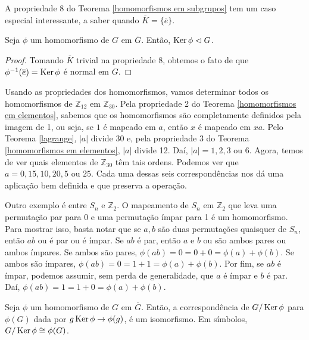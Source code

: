 	\par\vspace{0.3cm} A propriedade 8 do Teorema \eqref{homomorfismos em subgrupos} tem um caso especial interessante, a saber quando $\overline{K} = \{\overline{e}\}$.
	
	\begin{corollary}
		\label{nucleo normal}
		Seja $\phi$ um homomorfismo de $G$ em $\overline{G}$. Então, $\operatorname{Ker}\phi\vartriangleleft G$. 
	\end{corollary}
	
	\begin{proof}
		Tomando $\overline{K}$ trivial na propriedade 8, obtemos o fato de que $\phi^{-1}(\overline{e}) = \operatorname{Ker}\phi$ é normal em $G$.
	\end{proof}
	\par\vspace{0.3cm} Usando as propriedades dos homomorfismos, vamos determinar todos os homomorfismos de $\mathbb{Z}_{12}$ em $\mathbb{Z}_{30}$. Pela propriedade 2 do Teorema \eqref{homomorfismos em elementos}, sabemos que os homomorfismos são completamente definidos pela imagem de 1, ou seja, se $1$ é mapeado em $a$, então $x$ é mapeado em $xa$. Pelo Teorema \eqref{lagrange}, $|a|$ divide 30 e, pela propriedade 3 do Teorema \eqref{homomorfismos em elementos}, $|a|$ divide 12. Daí, $|a| = 1, 2, 3 \text{ ou } 6$. Agora, temos de ver quais elementos de $\mathbb{Z}_{30}$ têm tais ordens. Podemos ver que $a = 0, 15, 10, 20, 5 \text{ ou } 25$. Cada uma dessas seis correspondências nos dá uma aplicação bem definida e que preserva a operação.
	\par\vspace{0.3cm} Outro exemplo é entre $S_n$ e $\mathbb{Z}_2$.	O mapeamento de $S_n$ em $\mathbb{Z}_2$ que leva uma permutação par para 0 e uma permutação ímpar para 1 é um homomorfismo. Para mostrar isso, basta notar que se $a,b$ são duas permutações quaisquer de $S_n$, então $ab$ ou é par ou é ímpar. Se $ab$ é par, então $a$ e $b$ ou são ambos pares ou ambos ímpares. Se ambos são pares, $\phi(ab) = 0 = 0 + 0 = \phi(a) + \phi(b)$. Se ambos são ímpares, $\phi(ab) = 0 = 1 + 1 = \phi(a) + \phi(b)$. Por fim, se $ab$ é ímpar, podemos assumir, sem perda de generalidade, que $a$ é ímpar e $b$ é par. Daí, $\phi(ab) = 1 = 1 + 0 = \phi(a) + \phi(b)$.
	
	\begin{theorem}
		\label{primeiro teorema de isomorfismo}
		Seja $\phi$ um homomorfismo de $G$ em $\overline{G}$. Então, a correspondência de $G/\operatorname{Ker}\phi$ para $\phi(G)$ dada por $g\operatorname{Ker}\phi \to \phi(g)$, é um isomorfismo. Em símbolos, $G/\operatorname{Ker}\phi\cong\phi(G)$.
	\end{theorem}
	
